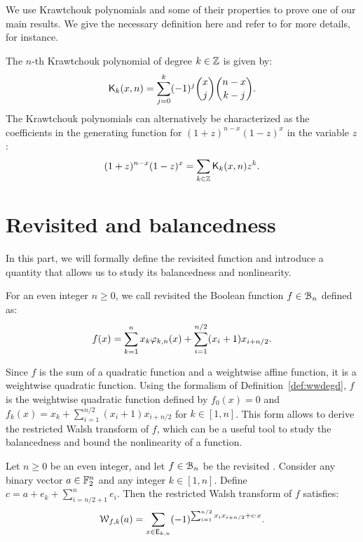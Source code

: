 \documentclass{llncs}
\begin{document}
We use Krawtchouk polynomials and some of their properties to prove one of our main results. We give the necessary definition here and refer to \cite{book:MacSlo78} for more details, for instance.

\begin{definition}\label{def:Kraw}
	The $n$-th Krawtchouk polynomial of degree $k\in\mathbb{Z}$ is given by:
    \[
        \mathsf{K}_{k}(x,n)=\sum_{j=0}^{k} (-1)^j \binom{x}{j} \binom{n-x}{k-j}.
    \]
    The Krawtchouk polynomials can alternatively be characterized as the coefficients in the generating function for $(1+z)^{n-x} (1-z)^x$ in the variable $z$:
    \[
        (1+z)^{n-x} (1-z)^x=\sum_{k\in\mathbb{Z}} \mathsf{K}_{k}(x,n) z^k.
    \]
\end{definition} 

\section{Revisited \hwbf{} and balancedness}\label{sec:defAndBal}

In this part, we will formally define the revisited \hwbf{} function and introduce a quantity that allows us to study its balancedness and nonlinearity.

\begin{definition}\label{def:revHWBF}
	For an even integer $n\geq 0$, we call revisited \hwbf{} the Boolean function $f\in\mathcal{B}_n$ defined as:
	\[
		f(x)=\sum_{k=1}^nx_k\varphi_{k,n}(x)+\sum_{i=1}^{n/2}(x_i+1) x_{i+n/2}.
	\]
\end{definition}

Since $f$ is the sum of a quadratic function and a weightwise affine function, it is a weightwise quadratic function. Using the formalism of Definition~\ref{def:wwdegd}, $f$ is the weightwise quadratic function defined by $f_0(x)=0$ and $f_k(x)=x_k+\sum_{i=1}^{n/2}(x_i+1) x_{i+n/2}$ for $k\in[1,n]$. This form allows to derive the restricted Walsh transform of $f$, which can be a useful tool to study the balancedness and bound the nonlinearity of a function.

\begin{proposition}\label{prop:restrWT}
	Let $n\geq 0$ be an even integer, and let $f\in\mathcal{B}_n$ be the revisited \hwbf{}. Consider any binary vector $a\in\mathbb{F}_2^n$ and any integer $k\in[1,n]$. Define $c=a+e_k+\sum_{i=n/2+1}^n e_i$. Then the restricted Walsh transform of $f$ satisfies:
	\[
		\mathcal{W}_{f,k}(a)=\sum_{x \in \mathsf{E}_{k,n}} (-1)^{\sum_{i=1}^{n/2} x_i x_{i+n/2}+ c \cdot x}.
	\]
\end{proposition}
\end{document}
